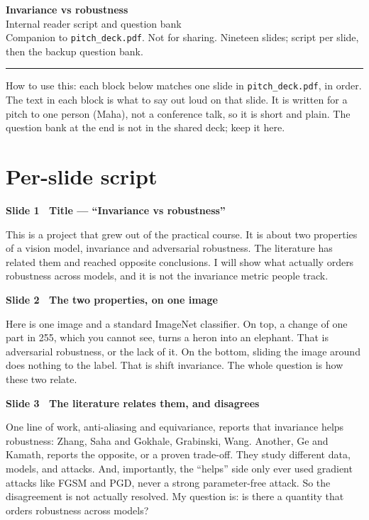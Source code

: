\documentclass[11pt]{article}
\newcommand{\slide}[3]{%
  \par\vspace{0.9em}%
  {\color{TUMblue}\bfseries Slide #1 \textbullet\ #2}\par
  \vspace{0.25em}#3\par}
\begin{document}
\begin{center}
  {\LARGE\bfseries\color{TUMdarker} Invariance vs robustness}\\[0.3em]
  {\large\color{slate} Internal reader script and question bank}\\[0.4em]
  {\small\color{slate} Companion to \texttt{pitch\_deck.pdf}. Not for sharing.
  Nineteen slides; script per slide, then the backup question bank.}
\end{center}
\vspace{0.6em}
\hrule
\vspace{0.4em}

{\small\color{slate} How to use this: each block below matches one slide in
\texttt{pitch\_deck.pdf}, in order. The text in each block is what to say out loud on that
slide. It is written for a pitch to one person (Maha), not a conference talk, so it is short and
plain. The question bank at the end is not in the shared deck; keep it here.}

\section{Per-slide script}

\slide{1}{Title --- ``Invariance vs robustness''}{%
This is a project that grew out of the practical course. It is about two properties of a vision
model, invariance and adversarial robustness. The literature has related them and reached opposite
conclusions. I will show what actually orders robustness across models, and it is not the invariance
metric people track.}

\slide{2}{The two properties, on one image}{%
Here is one image and a standard ImageNet classifier. On top, a change of one part in 255, which you
cannot see, turns a heron into an elephant. That is adversarial robustness, or the lack of it. On the
bottom, sliding the image around does nothing to the label. That is shift invariance. The whole
question is how these two relate.}

\slide{3}{The literature relates them, and disagrees}{%
One line of work, anti-aliasing and equivariance, reports that invariance helps robustness: Zhang,
Saha and Gokhale, Grabinski, Wang. Another, Ge and Kamath, reports the opposite, or a proven
trade-off. They study different data, models, and attacks. And, importantly, the ``helps'' side only
ever used gradient attacks like FGSM and PGD, never a strong parameter-free attack. So the
disagreement is not actually resolved. My question is: is there a quantity that orders robustness
across models?}
\end{document}
